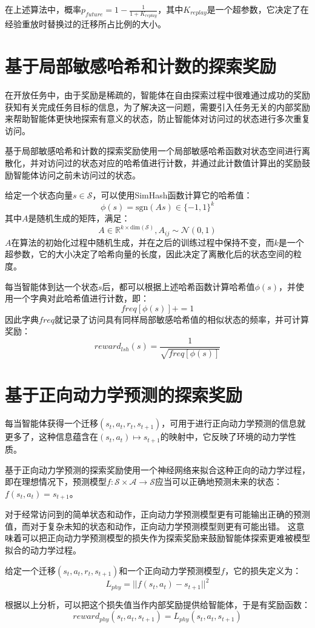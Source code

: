     在上述算法中，概率$p_{future}=1-\frac{1}{1+K_{replay}}$，其中$K_{replay}$是一个超参数，它决定了在经验重放时替换过的迁移所占比例的大小。

    \section{基于局部敏感哈希和计数的探索奖励}
    在开放任务中，由于奖励是稀疏的，智能体在自由探索过程中很难通过成功的奖励获知有关完成任务目标的信息，为了解决这一问题，需要引入任务无关的内部奖励来帮助智能体更快地探索有意义的状态，防止智能体对访问过的状态进行多次重复访问。

    基于局部敏感哈希和计数的探索奖励\cite{DBLP:journals/corr/TangHFSCDSTA16}使用一个局部敏感哈希函数对状态空间进行离散化，并对访问过的状态对应的哈希值进行计数，并通过此计数值计算出的奖励鼓励智能体访问之前未访问过的状态。

    给定一个状态向量$s\in \mathcal S$，可以使用SimHash函数计算它的哈希值：
    $$\phi(s)=\mathrm{sgn}(A s)\in\{-1,1\}^k$$
    其中$A$是随机生成的矩阵，满足：
    $$A\in \mathbb R^{k\times \mathrm{dim}(\mathcal S)}, A_{ij}\sim \mathcal N(0,1)$$ 
    $A$在算法的初始化过程中随机生成，并在之后的训练过程中保持不变，而$k$是一个超参数，它的大小决定了哈希向量的长度，因此决定了离散化后的状态空间的粒度。

    每当智能体到达一个状态$s$后，都可以根据上述哈希函数计算哈希值$\phi(s)$，并使用一个字典对此哈希值进行计数，即：
    $$freq[\phi(s)] += 1$$
    因此字典$freq$就记录了访问具有同样局部敏感哈希值的相似状态的频率，并可计算奖励：
    $$ reward_{lsh}(s)=\frac{1}{\sqrt{freq[\phi(s)]}}$$ 


    \section{基于正向动力学预测的探索奖励}
    每当智能体获得一个迁移$(s_t, a_t, r_t, s_{t+1})$，可用于进行正向动力学预测的信息就更多了，这种信息蕴含在$(s_t,a_t)\mapsto s_{t+1}$的映射中，它反映了环境的动力学性质。
    
    基于正向动力学预测的探索奖励\cite{DBLP:journals/corr/StadieLA15}使用一个神经网络来拟合这种正向的动力学过程，即在理想情况下，预测模型$f:\mathcal S\times \mathcal A\to \mathcal S$应当可以正确地预测未来的状态：$f(s_t, a_t) = s_{t+1}$。

    对于经常访问到的简单状态和动作，正向动力学预测模型更有可能输出正确的预测值，而对于复杂未知的状态和动作，正向动力学预测模型则更有可能出错。
    这意味着可以把正向动力学预测模型的损失作为探索奖励来鼓励智能体探索更难被模型拟合的动力学过程。

    给定一个迁移$(s_t, a_t, r_t, s_{t+1})$和一个正向动力学预测模型$f$，它的损失定义为：
    $$ L_{phy} = ||f(s_t, a_t) - s_{t+1}||^2$$ 

    根据以上分析，可以把这个损失值当作内部奖励提供给智能体，于是有奖励函数：
    $$ reward_{phy}(s_t, a_t, s_{t+1}) =  L_{phy}(s_t, a_t, s_{t+1}) $$ 
